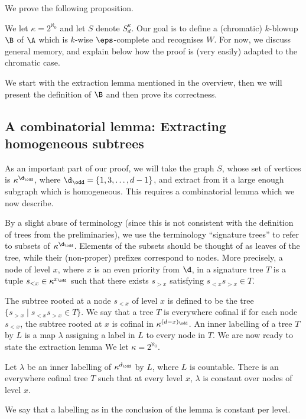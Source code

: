 We prove the following proposition.

\existenceEpsComplete*

We let $\kappa=2^{\aleph_0}$ and let $S$ denote $S_d^\kappa$.
Our goal is to define a (chromatic) $k$-blowup $\B$ of $\A$ which is $k$-wise $\eps$-complete and recognises $W$.
For now, we discuss general memory, and explain below how the proof is (very easily) adapted to the chromatic case.

We start with the extraction lemma mentioned in the overview, then we will present the definition of $\B$ and then prove its correctness.

\subsection{A combinatorial lemma: Extracting homogeneous subtrees}

As an important part of our proof, we will take the graph $S$, whose set of vertices is $\kappa^{\d_\odd}$, where $\d_\odd=\{1,3,\dots,d-1\}$, and extract from it a large enough subgraph which is homogeneous.
This requires a combinatorial lemma which we now describe.

By a slight abuse of terminology (since this is not consistent with the definition of trees from the preliminaries), we use the terminology ``signature trees'' to refer to subsets of $\kappa^{\d_\odd}$.
Elements of the subsets should be thought of as leaves of the tree, while their (non-proper) prefixes correspond to nodes.
More precisely, a node of level $x$, where $x$ is an even priority from $\d$, in a signature tree $T$ is a tuple $s_{< x} \in \kappa^{x_\odd}$ such that there exists $s_{> x}$ satisfying $s_{< x} s_{> x} \in T$.

The subtree rooted at a node $s_{<x}$ of level $x$ is defined to be the tree $\{s_{>x} \mid s_{<x}s_{>x} \in T\}$.
We say that a tree $T$ is everywhere cofinal if for each node $s_{< x}$, the subtree rooted at $x$ is cofinal in $\kappa^{(d-x)_\odd}$.
An inner labelling of a tree $T$ by $L$ is a map $\lambda$ assigning a label in $L$ to every node in $T$.
We are now ready to state the extraction lemma
We let $\kappa=2^{\aleph_0}$.

\begin{lemma}\label{lem:everywhere_cofinal}
Let $\lambda$ be an inner labelling of $\kappa^{d_\odd}$ by $L$, where $L$ is countable.
There is an everywhere cofinal tree $T$ such that at every level $x$, $\lambda$ is constant over nodes of level $x$.
\end{lemma}
We say that a labelling as in the conclusion of the lemma is constant per level.

